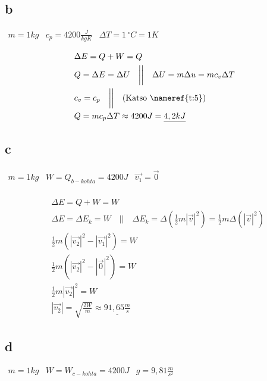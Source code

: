 \documentclass[12pt,a4paper,finnish]{article}
\begin{document}
\subsection{b}

\begin{math}
 \begin{array}{lll}
  m = 1 kg & c_p = 4200 \frac{J}{kgK} & \Delta T = 1\,^{\circ}C = 1 K
 \end{array}
\end{math}

\begin{align}
 &\Delta E = Q + W = Q\\
 &Q = \Delta E = \Delta U  \quad\bigg|\bigg|\quad  \Delta U = m\Delta u = mc_v\Delta T\\
 &c_v = c_p \quad\bigg|\bigg|\quad \text{(Katso \nameref{t:5})}\\
 &Q = mc_p\Delta T \approx 4200 J = \underline{4,2 kJ}
\end{align}

\subsection{c}

\begin{math}
 \begin{array}{lll}
  m = 1 kg & W = Q_{b-kohta} = 4200 J & \vec{v_1} = \vec{0}\\
 \end{array}
\end{math}

\begin{align}
 &\Delta E = Q + W = W\\
 &\Delta E = \Delta E_k = W \quad\bigg|\bigg|\quad 
 \Delta E_k = \Delta \left(\frac{1}{2}m|\vec{v}|^2\right) = \frac{1}{2}m\Delta\left(|\vec{v}|^2\right)\\
 &\frac{1}{2}m\left(|\vec{v_2}|^2 -|\vec{v_1}|^2\right) = W\\
 &\frac{1}{2}m\left(|\vec{v_2}|^2 -|\vec{0}|^2\right)
  = W\\
 &\frac{1}{2}m|\vec{v_2}|^2= W\\
 &|\vec{v_2}| = \sqrt{\frac{2W}{m}} \approx \underline{91,65 \frac{m}{s}}
\end{align}

\subsection{d}

\begin{math}
 \begin{array}{lll}
  m = 1 kg & W = W_{c-kohta} = 4200 J & g = 9,81 \frac{m}{s^2}
 \end{array}
\end{math}
\end{document}
